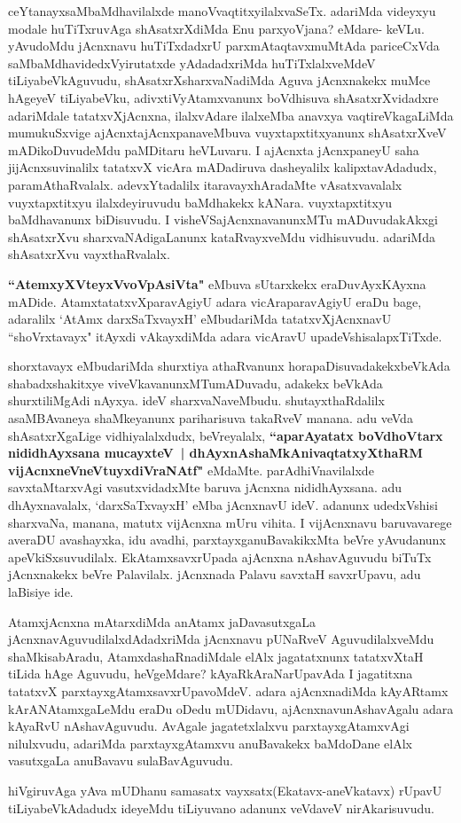 \begin{artha}
ceYtanayxsaMbaMdhavilalxde manoVvaqtitxyilalxvaSeTx. adariMda videyxyu
modale huTiTxruvAga shAsatxrXdiMda Enu parxyoVjana? eMdare-
keVLu. yAvudoMdu jAcnxnavu huTiTxdadxrU parxmAtaqtavxmuMtAda
pariceCxVda saMbaMdhavidedxVyirutatxde  yAdadadxriMda huTiTxlalxveMdeV
tiLiyabeVkAguvudu, shAsatxrXsharxvaNadiMda Aguva  jAcnxnakekx muMce
hAgeyeV tiLiyabeVku, adivxtiVyAtamxvanunx boVdhisuva shAsatxrXvidadxre
adariMdale tatatxvXjAcnxna, ilalxvAdare ilalxeMba anavxya
vaqtireVkagaLiMda mumukuSxvige ajAcnxtajAcnxpanaveMbuva
vuyxtapxtitxyanunx shAsatxrXveV mADikoDuvudeMdu paMDitaru heVLuvaru. I
ajAcnxta jAcnxpaneyU saha jijAcnxsuvinalilx tatatxvX vicAra mADadiruva
dasheyalilx kalipxtavAdadudx, paramAthaRvalalx. adevxYtadalilx\break
itaravayxhAradaMte vAsatxvavalalx vuyxtapxtitxyu ilalxdeyiruvudu
baMdhakekx kANara. vuyxtapxtitxyu baMdhavanunx biDisuvudu. I
visheVSajAcnxnavanunxMTu mADuvudakAkxgi shAsatxrXvu
sharxvaNAdigaLanunx kataRvayxveMdu vidhisuvudu. adariMda shAsatxrXvu vayxthaRvalalx.

\textbf{``AtemxyXVteyxVvoVpAsiVta"} eMbuva sUtarxkekx eraDuvAyxKAyxna
mADide. AtamxtatatxvXparavAgiyU adara vicAraparavAgiyU eraDu bage,
adaralilx `AtAmx darxSaTxvayxH' eMbudariMda tatatxvXjAcnxnavU ``shoVrxtavayx" itAyxdi
vAkayxdiMda adara vicAravU upadeVshisalapxTiTxde.

shorxtavayx eMbudariMda shurxtiya athaRvanunx
horapaDisuvadakekxbeVkAda shabadxshakitxye viveVkavanunxMTumADuvadu,
adakekx beVkAda shurxtiliMgAdi nAyxya. ideV
sharxvaNaveMbudu. shutayxthaRdalilx asaMBAvaneya shaMkeyanunx
pariharisuva takaRveV manana. adu veVda shAsatxrXgaLige
vidhiyalalxdudx, beVreyalalx, \textbf{``aparAyatatx boVdhoV\s \-tarx
nididhAyxsana mucayxteV~| dhAyxnAshaMkAnivaqtatxyXthaRM
vijAcnxneVneVtuyxdiVraNAtf"} eMdaMte. parAdhiVnavilalxde savxtaMtarxvAgi
vasutxvidadxMte baruva jAcnxna nididhAyxsana. adu dhAyxnavalalx,
`darxSaTxvayxH' eMba jAcnxnavU ideV. adanunx udedxVshisi sharxvaNa, manana,
matutx vijAcnxna mUru vihita. I vijAcnxnavu baruvavarege averaDU
avashayxka, idu avadhi, parxtayxganuBavakikxMta beVre yAvudanunx
apeVkiSxsuvudilalx. EkAtamxsavxrUpada ajAcnxna nAshavAguvudu biTuTx
jAcnxnakekx beVre Palavilalx. jAcnxnada Palavu savxtaH
savxrUpavu, adu laBisiye ide.
\end{artha}

\begin{artha}
AtamxjAcnxna mAtarxdiMda anAtamx jaDavasutxgaLa
jAcnxnavAguvudilalxdAdadxriMda  jAcnxnavu pUNaRveV AguvudilalxveMdu
shaMkisabAradu, AtamxdashaRnadiMdale elAlx jagatatxnunx tatatxvXtaH
tiLida hAge Aguvudu, heVgeMdare? kAyaRkAraNarUpavAda I jagatitxna
tatatxvX parxtayxgAtamxsavxrUpavoMdeV. adara ajAcnxnadiMda kAyARtamx
kArANAtamxgaLeMdu eraDu oDedu mUDidavu, ajAcnxnavunAshavAgalu
adara kAyaRvU nAshavAguvudu. AvAgale jagatetxlalxvu parxtayxgAtamxvAgi
nilulxvudu, adariMda parxtayxgAtamxvu anuBavakekx baMdoDane elAlx
vasutxgaLa anuBavavu sulaBavAguvudu.

hiVgiruvAga yAva mUDhanu samasatx vayxsatx(Ekatavx-aneVkatavx) rUpavU
tiLiyabeVkAdadudx ideyeMdu tiLiyuvano adanunx veVdaveV nirAkarisuvudu.
\end{artha}

